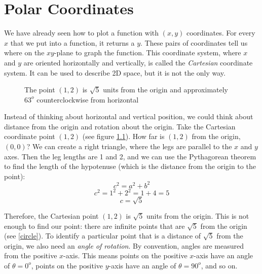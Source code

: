 \chapter{Polar Coordinates}

We have already seen how to plot a function with $(x,y)$ coordinates. For every $x$ that we put into a function, it returns a $y$. These pairs of coordinates tell us where on the $xy$-plane to graph the function. This coordinate system, where $x$ and $y$ are oriented horizontally and vertically, is called the \textit{Cartesian} coordinate system. It can be used to describe 2D space, but it is not the only way. 

\begin{figure}[htbp]
\centering
    \label{cartesian}
    \caption{The point $(1, 2)$ is $\sqrt{5}$ units from the origin and approximately $63^o$ counterclockwise from horizontal}
    \end{figure}

Instead of thinking about horizontal and vertical position, we could think about distance from the origin and rotation about the origin. Take the Cartesian coordinate point $(1, 2)$ (see figure \ref{cartesian}). How far is $(1,2)$ from the origin, $(0,0)$? We can create a right triangle, where the legs are parallel to the $x$ and $y$ axes. Then the leg lengths are 1 and 2, and we can use the Pythagorean theorem to find the length of the hypotenuse (which is the distance from the origin to the point):
$$c^2 = a^2 + b^2$$
$$c^2 = 1^2 + 2^2 = 1 + 4 = 5$$
$$c = \sqrt{5}$$

Therefore, the Cartesian point $(1, 2)$ is $\sqrt{5}$ units from the origin. This is not enough to find our point: there are infinite points that are $\sqrt{5}$ from the origin (see \ref{circle}). To identify a particular point that is a distance of $\sqrt{5}$ from the origin, we also need an \textit{angle of rotation}. By convention, angles are measured from the positive $x$-axis. This means points on the positive $x$-axis have an angle of $\theta = 0^o$, points on the positive $y$-axis have an angle of $\theta = 90^o$, and so on. 

